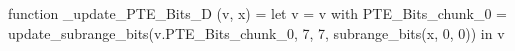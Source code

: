 function _update_PTE_Bits_D (v, x) = let v = { v with PTE_Bits_chunk_0 = update_subrange_bits(v.PTE_Bits_chunk_0, 7, 7, subrange_bits(x, 0, 0)) } in
  v
